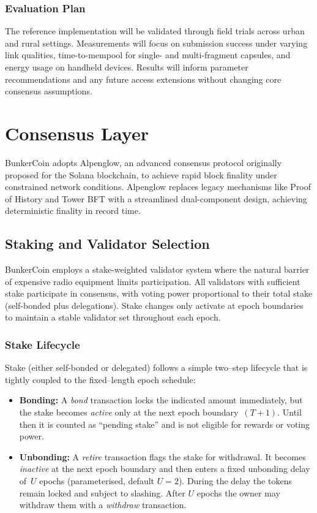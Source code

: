 \documentclass{article}
\begin{document}
\subsubsection{Evaluation Plan}

The reference implementation will be validated through field trials across urban and rural settings. Measurements will focus on submission success under varying link qualities, time-to-mempool for single- and multi-fragment capsules, and energy usage on handheld devices. Results will inform parameter recommendations and any future access extensions without changing core consensus assumptions.

\section{Consensus Layer}
\label{sec:consensus}

BunkerCoin adopts Alpenglow, an advanced consensus protocol originally proposed for the Solana blockchain, to achieve rapid block finality under constrained network conditions. Alpenglow replaces legacy mechanisms like Proof of History and Tower BFT with a streamlined dual-component design, achieving deterministic finality in record time.

\subsection{Staking and Validator Selection}
\label{sec:staking}

BunkerCoin employs a stake-weighted validator system where the natural barrier of expensive radio equipment limits participation. All validators with sufficient stake participate in consensus, with voting power proportional to their total stake (self-bonded plus delegations). Stake changes only activate at epoch boundaries to maintain a stable validator set throughout each epoch.

\subsubsection{Stake Lifecycle} 
\label{sec:stake_lifecycle}

Stake (either self-bonded or delegated) follows a simple two–step lifecycle that is tightly coupled to the fixed–length epoch schedule:
\begin{itemize}
    \item \textbf{Bonding:} A {\em bond} transaction locks the indicated amount immediately, but the stake becomes \emph{active} only at the next epoch boundary~$(T+1)$.  Until then it is counted as ``pending stake'' and is not eligible for rewards or voting power.
    \item \textbf{Unbonding:} A {\em retire} transaction flags the stake for withdrawal.  It becomes \emph{inactive} at the next epoch boundary and then enters a fixed unbonding delay of~$U$ epochs (parameterised, default $U=2$).  During the delay the tokens remain locked and subject to slashing.  After $U$ epochs the owner may withdraw them with a {\em withdraw} transaction.
\end{itemize}
\end{document}
